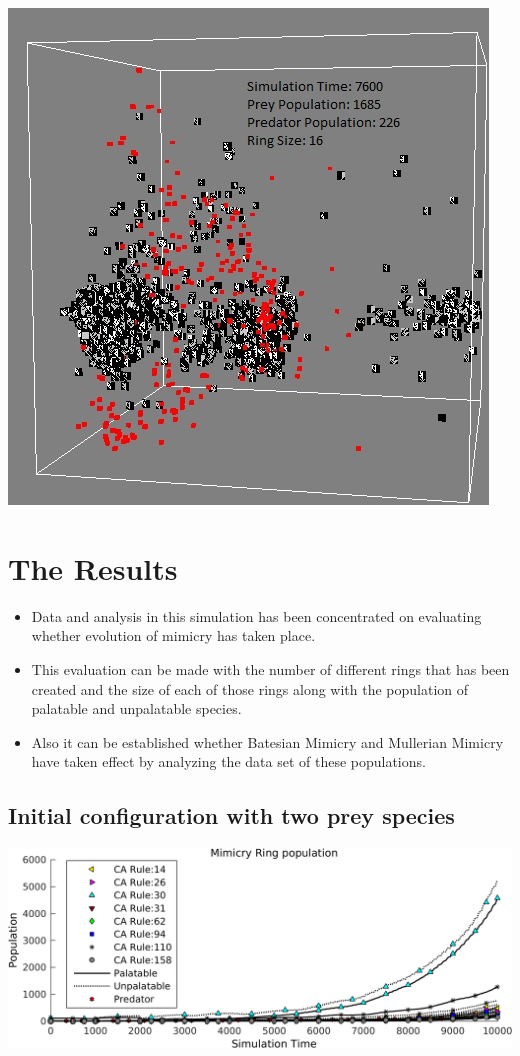\documentclass[a0,landscape]{a0poster}
\begin{document}
\begin{multicols}{5}
\begin{center}\vspace{1cm}
\includegraphics[width=0.5\linewidth]{simTime7600.png}
\end{center}\vspace{1cm}

\color{DarkSlateGray}
\section*{The Results}

\begin{itemize}
	\item Data and analysis in this simulation has been concentrated on evaluating whether evolution of mimicry has taken place.
	\item This evaluation can be made with the number of different rings that has been created and the size of each of those rings along with the population of palatable and unpalatable species.
	\item Also it can be established whether Batesian Mimicry and Mullerian Mimicry have taken effect by analyzing the data set of these populations.
\end{itemize}

\subsection*{Initial configuration with two prey species}

\begin{center}\vspace{1cm}
\includegraphics[width=0.8\linewidth]{simTime10k-2Prey.png}
\end{center}\vspace{1cm}


\end{multicols}
\end{document}
